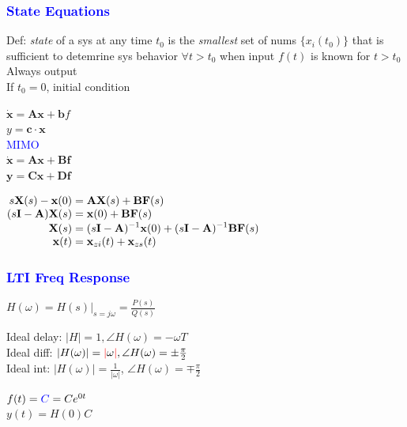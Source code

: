 \documentclass[4pt]{article}
\theoremstyle{definition}
\theoremstyle{definition}
\renewcommand{\o}{\omega}
\newcommand{\red}[1]{\textcolor{red}{#1}}
\newcommand{\blue}[1]{\textcolor{blue}{#1}}
\begin{document}
\begin{landscape}
\begin{multicols}{3}
\columnbreak
\subsubsection*{\blue{State Equations}}
    Def: \textit{state} of a sys at any time $t_0$ is the \textit{smallest} set of nums $\{x_i(t_0)\}$
        that is sufficient to detemrine sys behavior $\forall t > t_0$ 
        when input $f(t)$ is known for $t > t_0$\\
    Always \fbox{$\int$} output\\
    If $t_0 = 0$, initial condition


    \(\mathbf{\dot x} = \mathbf A \mathbf x + \mathbf b f\)\\
    \(y = \mathbf{c} \cdot \mathbf x\)\\
    \blue{MIMO}\\
    \(\mathbf{\dot x} = \mathbf A \mathbf x + \mathbf B \mathbf f\)\\
    \(\mathbf y = \mathbf C \mathbf x + \mathbf D \mathbf f\)

    \(
        \setlength{\jot}{0pt} %
        \begin{aligned}
            s \mathbf X(s) - \mathbf x(0) &= \mathbf A \mathbf X(s) + \mathbf B \mathbf F(s) \\
            (s \mathbf I - \mathbf A) \mathbf X(s) &= \mathbf x(0) + \mathbf B \mathbf F(s) \\
            \mathbf X(s) &= (s \mathbf I - \mathbf A)^{-1} \mathbf x(0) + (s \mathbf I - \mathbf A)^{-1} \mathbf B \mathbf F(s)\\
            \mathbf x(t) &= \mathbf x_{zi}(t) + \mathbf x_{zs}(t)
        \end{aligned}
    \)
\subsubsection*{\blue{LTI Freq Response}}
    \(H(\o) = H(s)|_{s = j\o} = \frac{P(s)}{Q(s)}\)     %

    Ideal delay: \(|H| = 1, \angle H(\o) = -\o T\)\\      %
    Ideal diff: \(|H(\o)| = \red{|} \o \red{|}, \angle H(\o) = \pm\frac {\pi} 2\)\\
    Ideal int: \(|H(\o)| = \frac 1 {|\o|}\), \(\angle H(\o) = \mp \frac{\pi} 2\)

    \(f(t) = \blue C = Ce^{0t}\)\\
    \(y(t) = H(0) C\)


\end{multicols}
\end{landscape}
\end{document}
